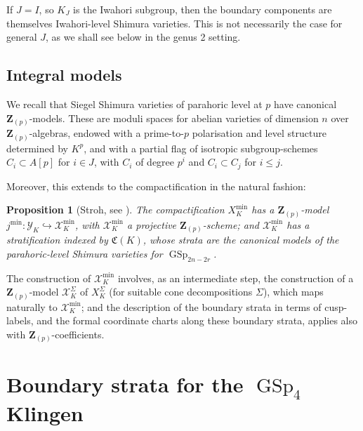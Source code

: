 \documentclass[cjm]{ipart}
\theoremstyle{plain}
\newtheorem{proposition}[theorem]{Proposition}
\theoremstyle{remark}
\DeclareMathOperator{\GSp}{GSp}
\newcommand{\ZZ}{\mathbf{Z}}
\newcommand{\cX}{\mathcal{X}}
\newcommand{\cY}{\mathcal{Y}}
\newcommand{\into}{\hookrightarrow}
\numberwithin{equation}{subsection}
\renewcommand{\le}{\leqslant}
\begin{document}
  \begin{remark}
   If $J = I$, so $K_J$ is the Iwahori subgroup, then the boundary components are themselves Iwahori-level Shimura varieties. This is not necessarily the case for general $J$, as we shall see below in the genus 2 setting.
  \end{remark}

 \subsection{Integral models}

  We recall that Siegel Shimura varieties of parahoric level at $p$ have canonical $\ZZ_{(p)}$-models. These are moduli spaces for abelian varieties of dimension $n$ over $\ZZ_{(p)}$-algebras, endowed with a prime-to-$p$ polarisation and level structure determined by $K^p$, and with a partial flag of isotropic subgroup-schemes $C_i \subset A[p]$ for $i \in J$, with $C_i$ of degree $p^i$ and $C_i \subset C_j$ for $i \le j$.

  Moreover, this extends to the compactification in the natural fashion:

  \begin{proposition}[{Stroh, see \cite[Theoreme principal] {stroh10-minimal}}]
   The compactification $X_K^{\min}$ has a $\ZZ_{(p)}$-model $j^{\min} : \cY_K \into \cX_K^{\min}$, with $\cX_K^{\min}$ a projective $\ZZ_{(p)}$-scheme; and $\cX_K^{\min}$ has a stratification indexed by $\mathfrak{C}(K)$, whose strata are the canonical models of the parahoric-level Shimura varieties for $\GSp_{2n-2r}$.
  \end{proposition}

  The construction of $\cX_K^{\min}$ involves, as an intermediate step, the construction of a $\ZZ_{(p)}$-model $\cX_K^{\Sigma}$ of $X_K^\Sigma$ (for suitable cone decompositions $\Sigma$), which maps naturally to $\cX_K^{\min}$; and the description of the boundary strata in terms of cusp-labels, and the formal coordinate charts along these boundary strata, applies also with $\ZZ_{(p)}$-coefficients.

\section{Boundary strata for the \texorpdfstring{$\GSp_4$}{GSp4} Klingen}
\end{document}
